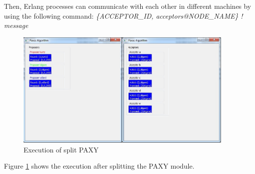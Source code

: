 Then, Erlang processes can communicate with each other in different machines by
using the following command: \newline
\textit{\{ACCEPTOR\_ID, acceptors@NODE\_NAME\} ! message}

\begin{figure}[h!]
  \centering
    \includegraphics[width=0.95\textwidth]{./3_Experiments/images/split.jpg}
    \caption{Execution of split PAXY \label{fig:split}}
\end{figure}
Figure \ref{fig:split} shows the execution after splitting the PAXY module.

